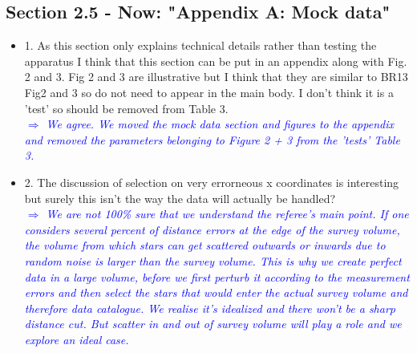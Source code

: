 \documentclass[10pt,a4paper]{article}
\newcommand{\Comment}[1]{\textsl{\textcolor{Blue}{$\Longrightarrow$ {#1}}}}
\begin{document}
\subsection{Section 2.5 - Now: "Appendix A: Mock data"}
\begin{itemize}
\item 1. As this section only explains technical details rather than testing the apparatus I think that this section can be put in an appendix along with Fig. 2 and 3. Fig 2 and 3 are illustrative but I think that they are similar to BR13 Fig2 and 3 so do not need to appear in the main body. I don't think it is a 'test' so should be removed from Table 3. \\\Comment{We agree. We moved the mock data section and figures to the appendix and removed the parameters belonging to Figure 2 + 3 from the 'tests' Table 3.}
\item 2. The discussion of selection on very errorneous x coordinates is interesting but surely this isn't the way the data will actually be handled?
\\\Comment{We are not 100\% sure that we understand the referee's main point. If one considers several percent of distance errors at the edge of the survey volume, the volume from which stars can get scattered outwards or inwards due to random noise is larger than the survey volume. This is why we create perfect data in a large volume, before we first perturb it according to the measurement errors and then select the stars that would enter the actual survey volume and therefore data catalogue. We realise it's idealized and there won't be a sharp distance cut. But scatter in and out of survey volume will play a role and we explore an ideal case.}
\end{itemize}
\end{document}
